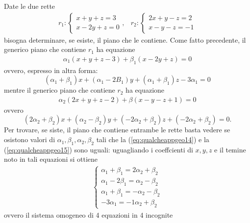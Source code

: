 \begin{es}
  Date le due rette
  \begin{eqnarray*}
    r_1:
    \begin{cases}
      x+y+z=3\\
      x-2y+z=0
    \end{cases}, & r_2:
                   \begin{cases}
                     2x+y-z=2\\
                     x-y-z=-1
                   \end{cases}
  \end{eqnarray*}
  bisogna determinare, se esiste, il piano che le contiene.
  Come fatto precedente, il generico piano che contiene $r_1$ ha
  equazione
  \begin{eqnarray*}
    \alpha_1(x+y+z-3)+\beta_1(x-2y+z)=0
  \end{eqnarray*}
  ovvero, espresso in altra forma:
  \begin{equation}
    \label{eq:qualcheappgeo14}
    (\alpha_1+\beta_1)x+(\alpha_1-2B_1)y+(\alpha_1+\beta_1)z-3\alpha_1=0
  \end{equation}
  mentre il generico piano che contiene $r_2$ ha equazione
  \begin{eqnarray*}
    \alpha_2(2x+y+z-2)+\beta(x-y-z+1)=0
  \end{eqnarray*}
  ovvero
  \begin{equation}
    \label{eq:qualcheappgeo15}
    (2\alpha_2+\beta_2)x+(\alpha_2-\beta_2)y+(-2\alpha_2+\beta_2)z
    +(-2\alpha_2+\beta_2)=0.
  \end{equation}
  Per trovare, se siste, il piano che contiene entrambe le rette basta
  vedere se osistono valori di $\alpha_1,\beta_1,\alpha_2,\beta_2$ tali
  che la (\ref{eq:qualcheappgeo14}) e la (\ref{eq:qualcheappgeo15}) sono
  uguali: uguagliando i coeffcienti di $x,y,z$ e il temine noto in tali
  equazioni si ottiene
  \begin{eqnarray*}
    \begin{cases}
      \alpha_1+\beta_1=2\alpha_2+\beta_2\\
      \alpha_1-2\beta_1=\alpha_2-\beta_2\\
      \alpha_1+\beta_1=-\alpha_2-\beta_2\\
      -3\alpha_1=-1\alpha_2+\beta_2
    \end{cases}
  \end{eqnarray*}
  ovvero il sistema omogeneo di 4 equazioni in 4 incognite
  \begin{eqnarray*}

\end{eqnarray*}
\end{es}

